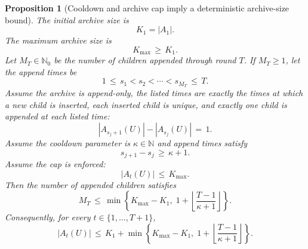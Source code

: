 \documentclass{article} %
\newtheorem{proposition}[theorem]{Proposition}
\begin{document}
\begin{proposition}[Cooldown and archive cap imply a deterministic archive-size bound]
\label{prop:15}
The initial archive size is
\begin{equation}
\label{eq:app-six-K1}
K_1=|A_1|.
\end{equation}
The maximum archive size is
\begin{equation}
\label{eq:app-six-Kmax}
K_{\max}\,\ge\, K_1.
\end{equation}
Let \(M_T\in\mathbb N_0\) be the number of children appended through round
\(T\). If \(M_T\ge1\), let the append times be
\begin{equation}
\label{eq:app-six-append-times}
1\,\le\, s_1<s_2<\cdots<s_{M_T}\,\le\, T.
\end{equation}
Assume the archive is append-only, the listed times are exactly the times at
which a new child is inserted, each inserted child is unique, and exactly one
child is appended at each listed time:
\begin{equation}
\label{eq:app-six-one-child}
|A_{s_j+1}(U)|-|A_{s_j}(U)|\,=\, 1.
\end{equation}
Assume the cooldown parameter is \(\kappa\in\mathbb{N}\) and append times satisfy
\begin{equation}
\label{eq:app-six-cooldown-condition}
s_{j+1}-s_j\,\ge\, \kappa+1.
\end{equation}
Assume the cap is enforced:
\begin{equation}
\label{eq:app-six-cap-condition}
|A_t(U)|\,\le\, K_{\max}.
\end{equation}
Then the number of appended children satisfies
\begin{equation}
\label{eq:app-six-MT-bound}
M_T
\,\le\,
\min\!\left\{
K_{\max}-K_1,\;
1+\left\lfloor\frac{T-1}{\kappa+1}\right\rfloor
\right\}.
\end{equation}
Consequently, for every \(t\in\{1,\ldots,T+1\}\),
\begin{equation}
\label{eq:app-six-archive-size-bound}
|A_t(U)|
\,\le\,
K_1+
\min\!\left\{
K_{\max}-K_1,\;
1+\left\lfloor\frac{T-1}{\kappa+1}\right\rfloor
\right\}.
\end{equation}
\end{proposition}
\end{document}
